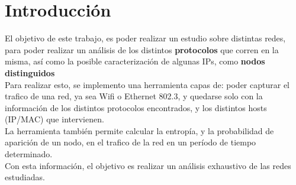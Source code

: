 \section{Introducción}

El objetivo de este trabajo, es poder realizar un estudio sobre distintas redes, para poder realizar un análisis de los distintos \textbf{protocolos} que corren en la misma, así como la posible caracterización de algunas IPs, como \textbf{nodos distinguidos}\\

Para realizar esto, se implemento una herramienta capas de: poder capturar el trafico de una red, ya sea Wifi o Ethernet 802.3, y quedarse solo con la información de los distintos protocolos encontrados, y los distintos hosts (IP/MAC) que intervienen.\\

La herramienta también permite calcular la entropía, y la probabilidad de aparición de un nodo, en el trafico de la red en un período de tiempo determinado.\\

Con esta información, el objetivo es realizar un análisis exhaustivo de las redes estudiadas.
